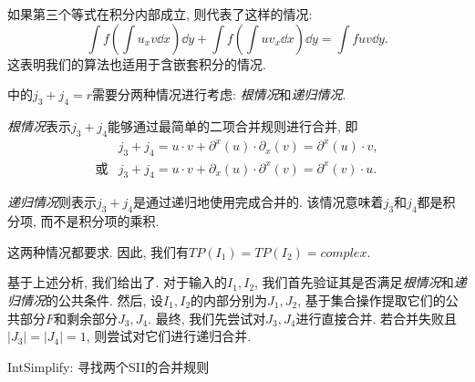 如果第三个等式在积分内部成立, 则代表了这样的情况:
\begin{equation}
\int\!{f \left(\int\!{u_x v\dd x}\right)\dd y}+\int\!{f \left(\int\!{u v_x \dd x}\right) \dd y} = \int\!{fuv\dd y}.
\end{equation}
这表明我们的算法也适用于含嵌套积分的情况. 

中的$j_3+j_4=r$需要分两种情况进行考虑: \emph{根情况}和\emph{递归情况}. 

\emph{根情况}表示$j_3+j_4$能够通过最简单的二项合并规则进行合并, 即
\begin{equation}
\begin{array}{rl}
& j_3+j_4=u \cdot v+\partial^x(u)\cdot \partial_x(v) = \partial^x(u)\cdot v, \\
\text{或}& j_3+j_4=u \cdot v+\partial_x(u)\cdot \partial^x(v) = \partial^x(v)\cdot u.
\end{array}
\label{root_form}
\end{equation}

\emph{递归情况}则表示$j_3+j_4$是通过递归地使用完成合并的. 该情况意味着$j_3$和$j_4$都是积分项, 而不是积分项的乘积.

这两种情况都要求. 因此, 我们有$TP(I_1)=TP(I_2)=complex$.  

基于上述分析, 我们给出了. 对于输入的$I_1,I_2$, 我们首先验证其是否满足\emph{根情况}和\emph{递归情况}的公共条件. 然后, 设$I_1,I_2$的内部分别为$J_1,J_2$, 基于集合操作提取它们的公共部分$F$和剩余部分$J_3,J_4$. 最终, 我们先尝试对$J_3,J_4$进行直接合并. 若合并失败且$|J_3|=|J_4|=1$, 则尝试对它们进行递归合并.  

\begin{algorithm}
\caption{IntSimplify: 寻找两个SII的合并规则}
\label{FindRuleForPair}
\end{algorithm}

